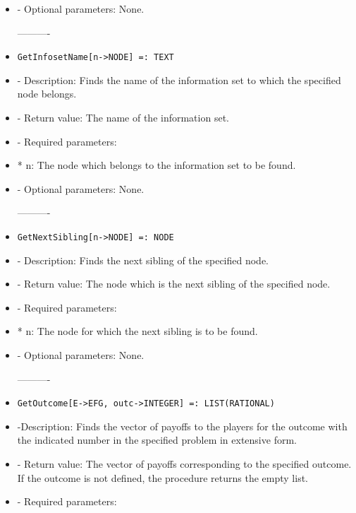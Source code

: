 \begin{itemize}
\item
- Optional parameters:  None.
\ed

----------
\item
\begin{verbatim}
GetInfosetName[n->NODE] =: TEXT
\end{verbatim}

\bd
\item
- Description:  Finds the name of the information set to which the 
specified node belongs.
\item
- Return value:  The name of the information set.
\item
- Required parameters:

\bd
\item
*  n:  The node which belongs to the information set to be found.
\ed

\item
- Optional parameters:  None.
\ed

----------

\item
\begin{verbatim}
GetNextSibling[n->NODE] =: NODE
\end{verbatim}

\bd
\item
- Description:  Finds the next sibling of the specified node.
\item
- Return value:  The node which is the next sibling of the specified 
node.
\item
- Required parameters:

\bd
\item
*  n:  The node for which the next sibling is to be found.
\ed

\item
- Optional parameters:  None.
\ed

----------
\item
\begin{verbatim}
GetOutcome[E->EFG, outc->INTEGER] =: LIST(RATIONAL)
\end{verbatim}

\bd
\item
-Description:  Finds the vector of payoffs to the players for the 
outcome with the indicated number in the specified problem in extensive
form.
\item
- Return value:  The vector of payoffs corresponding to the specified 
outcome.  If the outcome is not defined, the procedure returns the 
empty list.
\item
- Required parameters:


\end{itemize}
